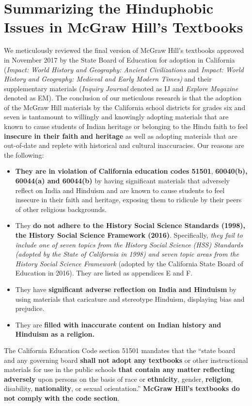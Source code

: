 \chapter[Summarizing the Hinduphobic Issues in\\ McGraw Hill’s Textbooks]{Summarizing the Hinduphobic Issues in McGraw Hill’s Textbooks}



We meticulously reviewed the final version of McGraw Hill’s textbooks approved in November 2017 by the State Board of Education for adoption in California (\textit{Impact: World History and Geography: Ancient Civilizations} and \textit{Impact: World History and Geography: Medieval and Early Modern Times)} and their supplementary materials (\textit{Inquiry Journal} denoted as IJ and \textit{Explore Magazine} denoted as EM). The conclusion of our meticulous research is  that the adoption of the McGraw Hill materials by the California school districts for grades six and seven is tantamount to willingly and knowingly adopting materials that are known to cause students of Indian heritage or belonging to the Hindu faith to feel \textbf{insecure in their faith and heritage} as well as adopting materials that are out-of-date and replete with historical and cultural inaccuracies. Our reasons are the following:

\begin{itemize} 
\item \textbf{They are in violation of California education codes 51501}, \textbf{60040(b), 60044(a) and 60044(b)} by having significant materials that adversely reflect on India and Hinduism and are known to cause students to feel insecure in their faith and heritage, exposing them to ridicule by their peers of other religious backgrounds. 
\item They \textbf{do not adhere to the History Social Science Standards (1998), the History Social Science Framework (2016)}. Specifically, \textit{they fail to include one of seven topics from the History Social Science (HSS) Standards (adopted by the State of California in 1998) and seven topic areas from the History Social Science Framework} (adopted by the California State Board of Education in 2016). They are listed as appendices E and F. 
\item They have \textbf{significant adverse reflection on India and Hinduism} by using materials that caricature and stereotype Hinduism, displaying bias and prejudice.
\item They are \textbf{filled with inaccurate content on Indian history and Hinduism as a religion.} 
\end{itemize}
The California Education Code section 51501 mandates that the “state board and any governing board \textbf{shall not adopt any textbooks} or other instructional materials for use in the public schools \textbf{that contain any matter reflecting adversely} upon persons on the basis of race or \textbf{ethnicity}, gender, \textbf{religion}, disability, \textbf{nationality}, or sexual orientation.” \textbf{McGraw Hill’s textbooks do} \textbf{not comply} \textbf{with the code section}. 

